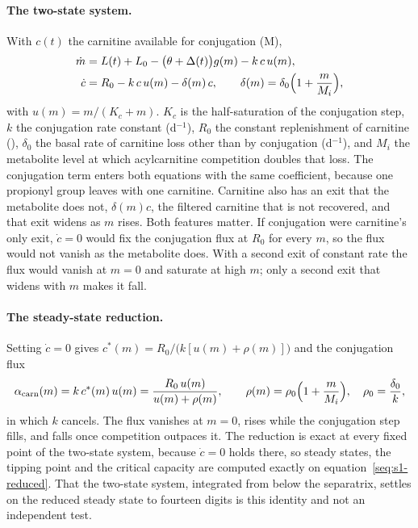 \paragraph{The two-state system.} With $c(t)$ the carnitine available for conjugation
(\textmu M),
\begin{equation}
\label{seq:s1-twostate}
\begin{aligned}
\dot m &= L(t)+L_0-\bigl(\theta+\Delta(t)\bigr)g(m)-k\,c\,u(m),\\
\dot c &= R_0-k\,c\,u(m)-\delta(m)\,c,\qquad \delta(m)=\delta_0\Bigl(1+\frac{m}{M_i}\Bigr),
\end{aligned}
\end{equation}
with $u(m)=m/(K_c+m)$. $K_c$ is the half-saturation of the conjugation step, $k$ the
conjugation rate constant (d$^{-1}$), $R_0$ the constant replenishment of carnitine
(\um), $\delta_0$ the basal rate of carnitine loss other than by conjugation (d$^{-1}$), and
$M_i$ the metabolite level at which acylcarnitine competition doubles that loss. The
conjugation term enters both equations with the same coefficient, because one propionyl
group leaves with one carnitine. Carnitine also has an exit that the metabolite does not,
$\delta(m)c$, the filtered carnitine that is not recovered, and that exit widens as $m$
rises. Both features matter. If conjugation were carnitine's only exit, $\dot c=0$ would fix
the conjugation flux at $R_0$ for every $m$, so the flux would not vanish as the metabolite
does. With a second exit of constant rate the flux would vanish at $m=0$ and saturate at high
$m$; only a second exit that widens with $m$ makes it fall.

\paragraph{The steady-state reduction.} Setting $\dot c=0$ gives
$c^{\ast}(m)=R_0/\bigl(k[u(m)+\rho(m)]\bigr)$ and the conjugation flux
\begin{equation}
\label{seq:s1-reduced}
\alpha_{\mathrm{carn}}(m)=k\,c^{\ast}(m)\,u(m)=\frac{R_0\,u(m)}{u(m)+\rho(m)},\qquad
\rho(m)=\rho_0\Bigl(1+\frac{m}{M_i}\Bigr),\quad \rho_0=\frac{\delta_0}{k},
\end{equation}
in which $k$ cancels. The flux vanishes at $m=0$, rises while the conjugation step fills,
and falls once competition outpaces it. The reduction is exact at every fixed point of the
two-state system, because $\dot c=0$ holds there, so steady states, the tipping point and
the critical capacity are computed exactly on equation~\eqref{seq:s1-reduced}. That the
two-state system, integrated from below the separatrix, settles on the reduced steady state
to fourteen digits is this identity and not an independent test.

